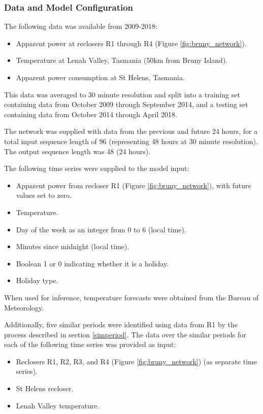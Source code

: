 \subsubsection{Data and  Model Configuration}
The following data was available from 2009-2018:
\begin{itemize}
	\item Apparent power at reclosers R1 through R4 (Figure \ref{fig:bruny_network}).
	\item Temperature at Lenah Valley, Tasmania (50km from Bruny Island). 
	\item Apparent power consumption at St Helens, Tasmania.
\end{itemize}

This data was averaged to 30 minute resolution and split into a training set containing data from October 2009 through September 2014, and a testing set containing data from October 2014 through April 2018.

The network was supplied with data from the previous and future 24 hours, for a total input sequence length of 96 (representing 48 hours at 30 minute resolution).
The output sequence length was 48 (24 hours).

The following time series were supplied to the model input:
\begin{itemize}
	\item Apparent power from recloser R1 (Figure \ref{fig:bruny_network}), with future values set to zero.
	\item Temperature.
	\item Day of the week as an integer from 0 to 6 (local time).
	\item Minutes since midnight (local time).
	\item Boolean 1 or 0 indicating whether it is a holiday.
	\item Holiday type.
\end{itemize}

When used for inference, temperature forecasts were obtained from the Bureau of Meteorology.

Additionally, five similar periods were identified using data from R1 by the process described in section \ref{simperiod}.
The data over the similar periods for each of the following time series was provided as input:
\begin{itemize}
	\item Reclosers R1, R2, R3, and R4 (Figure \ref{fig:bruny_network}) (as separate time series).
	\item St Helens recloser.
	\item Lenah Valley temperature.
\end{itemize}

